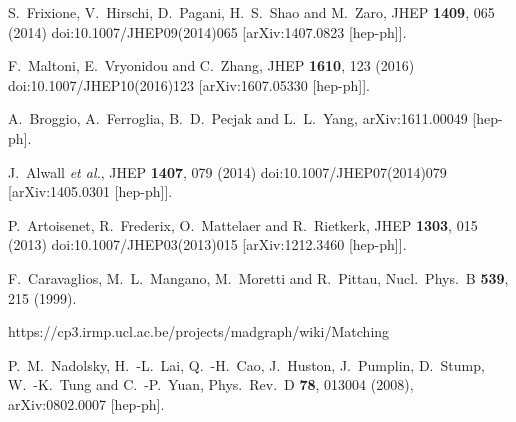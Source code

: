 \documentclass[twocolumn,prd,noshowpacs,nofootinbib,amsmath,amssymb,superscriptaddress,preprintnumbers]{revtex4}
\begin{document}
\begin{thebibliography}{99}
  S.~Frixione, V.~Hirschi, D.~Pagani, H.~S.~Shao and M.~Zaro,
  JHEP {\bf 1409}, 065 (2014)
  doi:10.1007/JHEP09(2014)065
  [arXiv:1407.0823 [hep-ph]].

  F.~Maltoni, E.~Vryonidou and C.~Zhang,
  JHEP {\bf 1610}, 123 (2016)
  doi:10.1007/JHEP10(2016)123
  [arXiv:1607.05330 [hep-ph]].

  A.~Broggio, A.~Ferroglia, B.~D.~Pecjak and L.~L.~Yang,
  arXiv:1611.00049 [hep-ph].

  J.~Alwall {\it et al.},
  JHEP {\bf 1407}, 079 (2014)
  doi:10.1007/JHEP07(2014)079
  [arXiv:1405.0301 [hep-ph]].


  P.~Artoisenet, R.~Frederix, O.~Mattelaer and R.~Rietkerk,
  JHEP {\bf 1303}, 015 (2013)
  doi:10.1007/JHEP03(2013)015
  [arXiv:1212.3460 [hep-ph]].

  F.~Caravaglios, M.~L.~Mangano, M.~Moretti and R.~Pittau,
  Nucl.\ Phys.\ B {\bf 539}, 215 (1999).

https://cp3.irmp.ucl.ac.be/projects/madgraph/wiki/Matching

P.~M.~Nadolsky, H.~-L.~Lai, Q.~-H.~Cao, J.~Huston, J.~Pumplin,
D.~Stump, W.~-K.~Tung and C.~-P.~Yuan,
Phys.\ Rev.\ D {\bf 78}, 013004 (2008), arXiv:0802.0007 [hep-ph].


\end{thebibliography}
\end{document}
